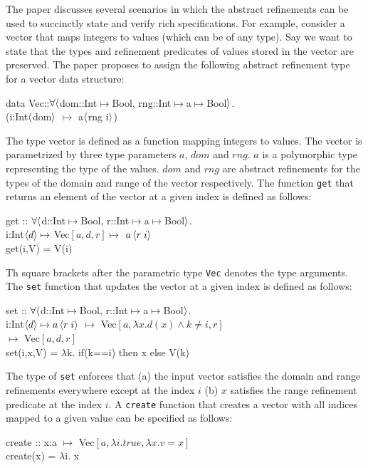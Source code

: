 The paper discusses several scenarios in which the abstract refinements can be used to succinctly state and verify rich specifications. For example, consider a vector that maps integers to values (which can be of any type).
Say we want to state that the types and refinement predicates of values stored in
the vector are preserved. The paper proposes to assign the following abstract refinement type for a vector data structure:
%
\begin{myprogram}
data Vec::$\forall \langle$dom::Int$\mapsto$Bool, rng::Int$\mapsto$a$\mapsto$Bool$\rangle$. \\
\> (i:Int$\langle$dom$\rangle$ $\mapsto$ a$\langle$rng i$\rangle$)
\end{myprogram}
%
The type vector is defined as a function mapping integers to values. 
The vector is parametrized by three type parameters $a$, $dom$ and $rng$.
$a$ is a polymorphic type representing the type of the values.
$dom$ and $rng$ are abstract refinements for the types of the domain and range of the vector respectively.
The function \texttt{get} that returns an element of the vector at a given index is defined as follows:
%
\begin{myprogram}
get :: $\forall \langle$d::Int$\mapsto$Bool, r::Int$\mapsto$a$\mapsto$Bool$\rangle$. \\
\> \> i:Int$\left< d \right> \mapsto$ Vec$[a,d,r] \mapsto$ $a\left< r \; i \right>$ \\
\> get(i,V) = V(i)
\end{myprogram}
%
Th square brackets after the parametric type \texttt{Vec} denotes the type arguments.
The \texttt{set} function that updates the vector at a given index is defined as follows:
%
\begin{myprogram}
set :: $\forall \langle$d::Int$\mapsto$Bool, r::Int$\mapsto$a$\mapsto$Bool$\rangle$. \\
\> \> i:Int$\left< d \right> \mapsto a\left< r \; i \right>$ $\mapsto$ 
Vec$[a,\lambda x. d(x) \wedge k \ne i,r]$ \\
\> \> $\mapsto$ Vec$[a,d,r]$ \\
\> set(i,x,V) = $\lambda$k. if(k==i)  then x else V(k)
\end{myprogram}
%
The type of \texttt{set} enforces that (a) the input vector satisfies the
domain and range refinements everywhere except at the index $i$ 
(b) $x$ satisfies the range refinement predicate at the index $i$.
A \texttt{create} function that creates a vector with all indices mapped 
to a given value can be specified as follows:
%
\begin{myprogram}
create :: x:a $\mapsto$ Vec$[a,\lambda i.true,\lambda x. v = x]$  \\
\> create(x) = $\lambda$i. x
\end{myprogram}
